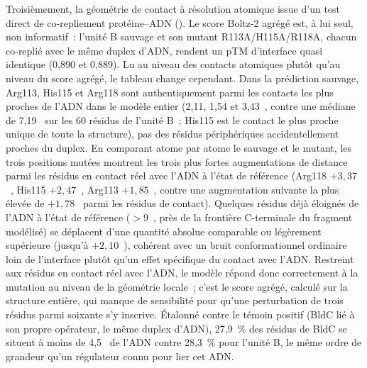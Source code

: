 \documentclass[11pt,a4paper]{article}
\newcommand{\ang}{\text{\AA}}
\begin{document}
Troisièmement, la géométrie de contact à résolution atomique issue d'un test direct de
co-repliement protéine--ADN (). Le score Boltz-2 agrégé est, à lui seul, non
informatif~: l'unité B sauvage et son mutant R113A/H115A/R118A, chacun co-replié avec le même
duplex d'ADN, rendent un pTM d'interface quasi identique (0,890 et 0,889). Lu au niveau des
contacts atomiques plutôt qu'au niveau du score agrégé, le tableau change cependant. Dans la
prédiction sauvage, Arg113, His115 et Arg118 sont authentiquement parmi les contacts les plus
proches de l'ADN dans le modèle entier (2,11, 1,54 et 3,43~\ang{}, contre une médiane de 7,19~\ang{}
sur les 60 résidus de l'unité B~; His115 est le contact le plus proche unique de toute la
structure), pas des résidus périphériques accidentellement proches du duplex. En comparant
atome par atome le sauvage et le mutant, les trois positions mutées montrent les trois plus fortes
augmentations de distance parmi les résidus en contact réel avec l'ADN à l'état de référence
(Arg118 $+3,37$~\ang{}, His115 $+2,47$~\ang{}, Arg113 $+1,85$~\ang{}, contre une augmentation
suivante la plus élevée de $+1,78$~\ang{} parmi les résidus de contact). Quelques résidus déjà
éloignés de l'ADN à l'état de référence ($>9$~\ang{}, près de la frontière C-terminale du fragment
modélisé) se déplacent d'une quantité absolue comparable ou légèrement supérieure (jusqu'à
$+2,10$~\ang{}), cohérent avec un bruit conformationnel ordinaire loin de l'interface plutôt qu'un
effet spécifique du contact avec l'ADN. Restreint aux résidus en contact réel avec l'ADN, le modèle
répond donc correctement à la mutation au niveau de la géométrie locale~; c'est le score agrégé,
calculé sur la structure entière, qui manque de sensibilité pour qu'une perturbation de trois
résidus parmi soixante s'y inscrive. Étalonné contre le témoin positif (BldC lié à son propre
opérateur, le même duplex d'ADN), 27,9~\% des résidus de BldC se situent à moins de 4,5~\ang{} de
l'ADN contre 28,3~\% pour l'unité B, le même ordre de grandeur qu'un régulateur connu pour lier cet
ADN.
\end{document}
